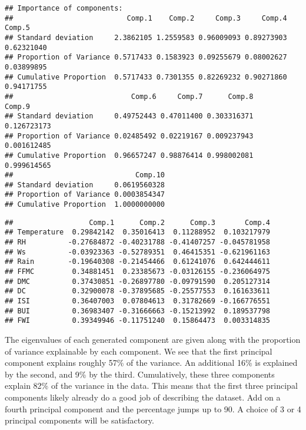 \documentclass[
]{article}
\newenvironment{Shaded}{\begin{snugshade}}{\end{snugshade}}
\newcommand{\CommentTok}[1]{\textcolor[rgb]{0.56,0.35,0.01}{\textit{#1}}}
\newcommand{\DecValTok}[1]{\textcolor[rgb]{0.00,0.00,0.81}{#1}}
\newcommand{\NormalTok}[1]{#1}
\newcommand{\SpecialCharTok}[1]{\textcolor[rgb]{0.81,0.36,0.00}{\textbf{#1}}}
\begin{document}
\begin{verbatim}
## Importance of components:
##                           Comp.1    Comp.2     Comp.3     Comp.4     Comp.5
## Standard deviation     2.3862105 1.2559583 0.96009093 0.89273903 0.62321040
## Proportion of Variance 0.5717433 0.1583923 0.09255679 0.08002627 0.03899895
## Cumulative Proportion  0.5717433 0.7301355 0.82269232 0.90271860 0.94171755
##                            Comp.6     Comp.7      Comp.8      Comp.9
## Standard deviation     0.49752443 0.47011400 0.303316371 0.126723173
## Proportion of Variance 0.02485492 0.02219167 0.009237943 0.001612485
## Cumulative Proportion  0.96657247 0.98876414 0.998002081 0.999614565
##                             Comp.10
## Standard deviation     0.0619560328
## Proportion of Variance 0.0003854347
## Cumulative Proportion  1.0000000000
\end{verbatim}

\begin{Shaded}
\end{Shaded}

\begin{verbatim}
##                  Comp.1      Comp.2      Comp.3       Comp.4
## Temperature  0.29842142  0.35016413  0.11288952  0.103217979
## RH          -0.27684872 -0.40231788 -0.41407257 -0.045781958
## Ws          -0.03923363 -0.52789351  0.46415351 -0.621961163
## Rain        -0.19640308 -0.21454466  0.61241076  0.642444611
## FFMC         0.34881451  0.23385673 -0.03126155 -0.236064975
## DMC          0.37430851 -0.26897780 -0.09791590  0.205127314
## DC           0.32900078 -0.37895685 -0.25577553  0.161633611
## ISI          0.36407003  0.07804613  0.31782669 -0.166776551
## BUI          0.36983407 -0.31666663 -0.15213992  0.189537798
## FWI          0.39349946 -0.11751240  0.15864473  0.003314835
\end{verbatim}

The eigenvalues of each generated component are given along with the
proportion of variance explainable by each component. We see that the
first principal component explains roughly 57\% of the variance. An
additional 16\% is explained by the second, and 9\% by the third.
Cumulatively, these three components explain 82\% of the variance in the
data. This means that the first three principal components likely
already do a good job of describing the dataset. Add on a fourth
principal component and the percentage jumps up to 90. A choice of 3 or
4 principal components will be satisfactory.
\end{document}
